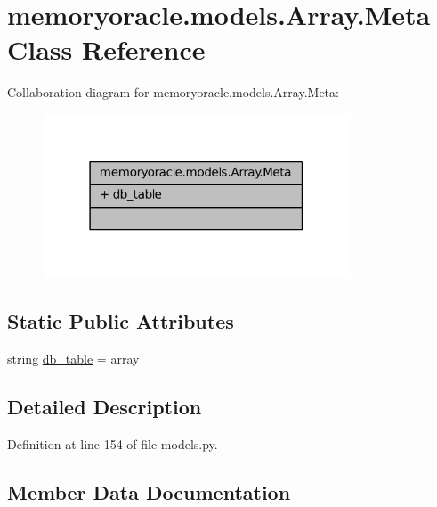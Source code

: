 \hypertarget{classmemoryoracle_1_1models_1_1Array_1_1Meta}{}\section{memoryoracle.\+models.\+Array.\+Meta Class Reference}
\label{classmemoryoracle_1_1models_1_1Array_1_1Meta}


Collaboration diagram for memoryoracle.\+models.\+Array.\+Meta\+:
\nopagebreak
\begin{figure}[H]
\begin{center}
\leavevmode
\includegraphics[width=259pt]{classmemoryoracle_1_1models_1_1Array_1_1Meta__coll__graph}
\end{center}
\end{figure}
\subsection*{Static Public Attributes}
\begin{DoxyCompactItemize}
\item 
string \hyperlink{classmemoryoracle_1_1models_1_1Array_1_1Meta_a9efa9bd2a6907abc7692e196d0055a37}{db\+\_\+table} = \textquotesingle{}array\textquotesingle{}
\end{DoxyCompactItemize}


\subsection{Detailed Description}


Definition at line 154 of file models.\+py.



\subsection{Member Data Documentation}
\hypertarget{classmemoryoracle_1_1models_1_1Array_1_1Meta_a9efa9bd2a6907abc7692e196d0055a37}{}
